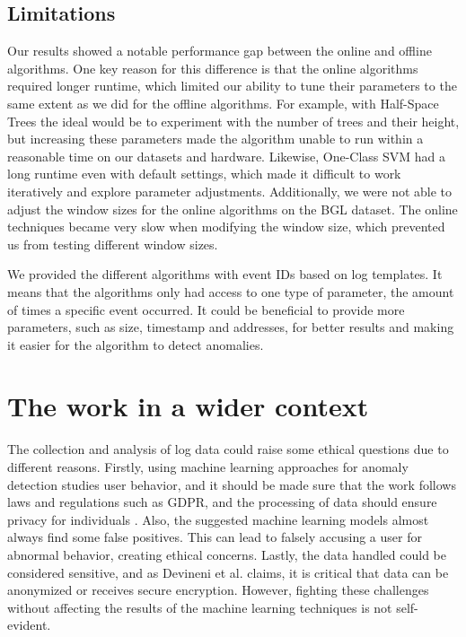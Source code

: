 \subsection{Limitations}
Our results showed a notable performance gap between the online and offline algorithms. One key reason for this difference is that the online algorithms required longer runtime, which limited our ability to tune their parameters to the same extent as we did for the offline algorithms. For example, with Half-Space Trees the ideal would be to experiment with the number of trees and their height, but increasing these parameters made the algorithm unable to run within a reasonable time on our datasets and hardware. Likewise, One-Class SVM had a long runtime even with default settings, which made it difficult to work iteratively and explore parameter adjustments. Additionally, we were not able to adjust the window sizes for the online algorithms on the BGL dataset. The online techniques became very slow when modifying the window size, which prevented us from testing different window sizes. 

We provided the different algorithms with event IDs based on log templates. It means that the algorithms only had access to one type of parameter, the amount of times a specific event occurred. It could be beneficial to provide more parameters, such as size, timestamp and addresses, for better results and making it easier for the algorithm to detect anomalies. 

\section{The work in a wider context}
\label{sec:work-wider-context}
The collection and analysis of log data could raise some ethical questions due to different reasons. Firstly, using machine learning approaches for anomaly detection studies user behavior, and it should be made sure that the work follows laws and regulations such as GDPR, and the processing of data should ensure privacy for individuals \cite{Devineni2023datasecurityandintegrity}. Also, the suggested machine learning models almost always find some false positives. This can lead to falsely accusing a user for abnormal behavior, creating ethical concerns. Lastly, the data handled could be considered sensitive, and as Devineni et al.\cite{Devineni2023datasecurityandintegrity} claims, it is critical that data can be anonymized or receives secure encryption. However, fighting these challenges without affecting the results of the machine learning techniques is not self-evident.



